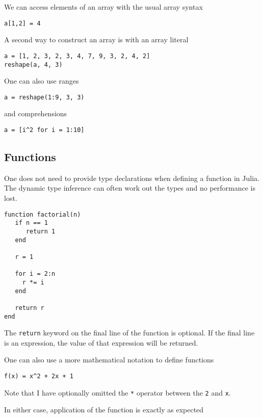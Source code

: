 \documentclass[a4paper,10pt]{article}
\newcommand{\code}{\lstinline}
\begin{document}
{{{{We can access elements of an array with the usual array syntax

\begin{lstlisting}
a[1,2] = 4
\end{lstlisting}

A second way to construct an array is with an array literal

\begin{lstlisting}
a = [1, 2, 3, 2, 3, 4, 7, 9, 3, 2, 4, 2]
reshape(a, 4, 3)
\end{lstlisting}

One can also use ranges

\begin{lstlisting}
a = reshape(1:9, 3, 3)
\end{lstlisting}

and comprehensions

\begin{lstlisting}
a = [i^2 for i = 1:10]
\end{lstlisting}

\subsection{Functions}

One does not need to provide type declarations when defining a function in Julia. The dynamic
type inference can often work out the types and no performance is lost.

\begin{lstlisting}
function factorial(n)
   if n == 1
      return 1
   end

   r = 1
   
   for i = 2:n
     r *= i
   end

   return r  
end
\end{lstlisting}

The \code{return} keyword on the final line of the function is optional. If the final line is 
an expression, the value of that expression will be returned.

One can also use a more mathematical notation to define functions

\begin{lstlisting}
f(x) = x^2 + 2x + 1
\end{lstlisting}

Note that I have optionally omitted the \code{*} operator between the \code{2} and \code{x}.

In either case, application of the function is exactly as expected

}}}}
\end{document}

